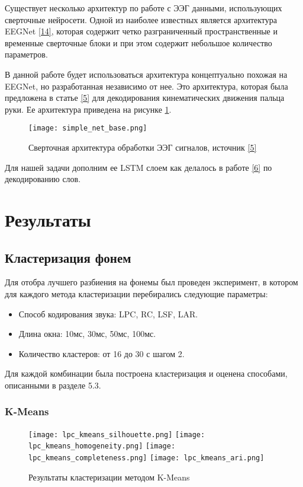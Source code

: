 \documentclass[a4paper,14pt]{extarticle}
\begin{document}
Существует несколько архитектур по работе с ЭЭГ данными, использующих сверточные нейросети. Одной из наиболее известных является архитектура EEGNet \hyperlink{b_14}{[14]}, которая содержит четко разграниченный пространственные и временные сверточные блоки и при этом содержит небольшое количество параметров.

В данной работе будет использоваться архитектура концептуально похожая на EEGNet, но разработанная независимо от нее. Это архитектура, которая была предложена в статье \hyperlink{b_5}{[5]} для декодирования кинематических движения пальца руки. Ее архитектура приведена на рисунке \ref{fig:simple_net_base}.

\begin{figure}[H]
	\centering
	\texttt{[image: simple\_net\_base.png]}
	\caption{Сверточная архитектура обработки ЭЭГ сигналов, источник \protect\hyperlink{b_5}{[5]} }
	\label{fig:simple_net_base}
\end{figure}

Для нашей задачи дополним ее LSTM слоем как делалось в работе \hyperlink{b_6}{[6]} по декодированию слов.

\section{Результаты}

\subsection{Кластеризация фонем}
Для отобра лучшего разбиения на фонемы был проведен эксперимент, в котором для каждого метода кластеризации перебирались следующие параметры:
\begin{itemize}
	\item Способ кодирования звука: LPC, RC, LSF, LAR.
	\item Длина окна: 10мс, 30мс, 50мс, 100мс.
	\item Количество кластеров: от 16 до 30 с шагом 2.
\end{itemize}
Для каждой комбинации была построена кластеризация и оценена способами, описанными в разделе 5.3. 

\subsubsection{K-Means}
\begin{figure}[H]
	\centering
	\texttt{[image: lpc\_kmeans\_silhouette.png]}
	\texttt{[image: lpc\_kmeans\_homogeneity.png]}
	\texttt{[image: lpc\_kmeans\_completeness.png]}
	\texttt{[image: lpc\_kmeans\_ari.png]}
	\caption{Результаты кластеризации методом K-Means}
	\label{fig:kmeans}
\end{figure}
\end{document}
